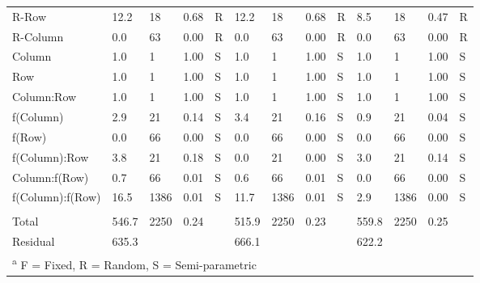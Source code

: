 \begin{landscape}
\begin{table}[H]
{\begin{tabular}[t]{lllllllllllll}
R-Row & 12.2 & 18 & 0.68 & R & 12.2 & 18 & 0.68 & R & 8.5 & 18 & 0.47 & R\\
R-Column & 0.0 & 63 & 0.00 & R & 0.0 & 63 & 0.00 & R & 0.0 & 63 & 0.00 & R\\
\addlinespace
Column & 1.0 & 1 & 1.00 & S & 1.0 & 1 & 1.00 & S & 1.0 & 1 & 1.00 & S\\
Row & 1.0 & 1 & 1.00 & S & 1.0 & 1 & 1.00 & S & 1.0 & 1 & 1.00 & S\\
Column:Row & 1.0 & 1 & 1.00 & S & 1.0 & 1 & 1.00 & S & 1.0 & 1 & 1.00 & S\\
f(Column) & 2.9 & 21 & 0.14 & S & 3.4 & 21 & 0.16 & S & 0.9 & 21 & 0.04 & S\\
f(Row) & 0.0 & 66 & 0.00 & S & 0.0 & 66 & 0.00 & S & 0.0 & 66 & 0.00 & S\\
\addlinespace
f(Column):Row & 3.8 & 21 & 0.18 & S & 0.0 & 21 & 0.00 & S & 3.0 & 21 & 0.14 & S\\
Column:f(Row) & 0.7 & 66 & 0.01 & S & 0.6 & 66 & 0.01 & S & 0.0 & 66 & 0.00 & S\\
f(Column):f(Row) & 16.5 & 1386 & 0.01 & S & 11.7 & 1386 & 0.01 & S & 2.9 & 1386 & 0.00 & S\\
 &  &  &  &  &  &  &  &  &  &  &  & \\
Total & 546.7 & 2250 & 0.24 &  & 515.9 & 2250 & 0.23 &  & 559.8 & 2250 & 0.25 & \\
\addlinespace
Residual & 635.3 &  &  &  & 666.1 &  &  &  & 622.2 &  &  & \\
\bottomrule
\multicolumn{13}{l}{\rule{0pt}{1em}\textsuperscript{a} F = Fixed, R = Random, S = Semi-parametric}\\
\end{tabular}}
\end{table}

\end{landscape}
\restoregeometry

